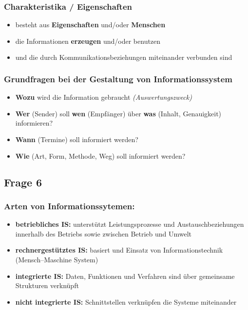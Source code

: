 \documentclass[a4paper]{article}
\begin{document}
			\subsubsection{Charakteristika / Eigenschaften}
			\begin{itemize}
				\item besteht aus \textbf{Eigenschaften} und/oder \textbf{Menschen}
				\item die Informationen \textbf{erzeugen} und/oder benutzen
				\item und die durch Kommunikationsbeziehungen miteinander verbunden sind
			\end{itemize}
			\hrulefill
			\subsubsection{Grundfragen bei der Gestaltung von Informationssystem}
			\begin{itemize}
				\item \textbf{Wozu} wird die Information gebraucht \textit{(Auswertungszweck)}
				\item \textbf{Wer} (Sender) soll \textbf{wen} (Empfänger) über \textbf{was} (Inhalt, Genauigkeit) informieren?
				\item \textbf{Wann} (Termine) soll informiert werden?
				\item \textbf{Wie} (Art, Form, Methode, Weg) soll informiert werden?
			\end{itemize}
			
			\subsection{Frage 6}
			\label{le1-6}
			\subsubsection{Arten von Informationssytemen:}
			\begin{itemize}
				\item \textbf{betriebliches IS:} unterstützt Leistungsprozesse und Austauschbeziehungen innerhalb des Betriebs sowie zwischen Betrieb und Umwelt
				\item \textbf{rechnergestütztes IS:} basiert und Einsatz von Informationstechnik (Mensch--Maschine System)
				\item \textbf{integrierte IS:} Daten, Funktionen und Verfahren sind über gemeinsame Strukturen verknüpft
				\item \textbf{nicht integrierte IS:} Schnittstellen verknüpfen die Systeme miteinander
			\end{itemize}
			
\end{document}
